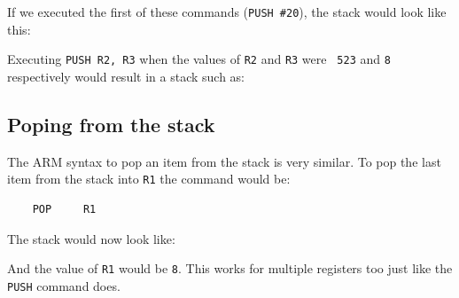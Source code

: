 If we executed the first of these commands ({\tt PUSH \#20}), the stack would
look like this:

\begin{center}
\begin{drawstack}
		
		
		
		
		
\end{drawstack}
\end{center}

Executing {\tt PUSH R2, R3} when the values of {\tt R2} and {\tt R3} were {\tt
523} and {\tt 8} respectively would result in a stack such as:

\begin{center}
\begin{drawstack}
		
		
		
		
		
\end{drawstack}
\end{center}

\subsection{Poping from the stack}

The ARM syntax to pop an item from the stack is very similar. To pop the last
item from the stack into {\tt R1} the command would be:

\begin{verbatim}
	POP 	R1
\end{verbatim}

The stack would now look like:

\begin{center}
\begin{drawstack}
		
		
		
		
		
\end{drawstack}
\end{center}

And the value of {\tt R1} would be {\tt 8}. This works for multiple registers
too just like the {\tt PUSH} command does.
	


